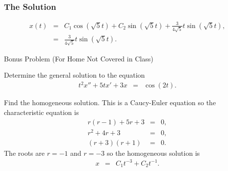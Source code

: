 \begin{frame}
  \frametitle{The Solution}

  \begin{eqnarray*}
    x(t) & = & C_1 \cos(\sqrt{5}t) + C_2\sin(\sqrt{5} t) + \frac{3}{4\sqrt{5}} t \sin(\sqrt{5}t), \\
         & = & \frac{3}{4\sqrt{5}} t \sin(\sqrt{5}t).
  \end{eqnarray*}


\end{frame}


\begin{frame}{Bonus Problem  (For Home Not Covered in Class)}

  Determine the general solution to the equation
  \begin{eqnarray*}
    t^2 x'' + 5t x' + 3x & = & \cos(2t).
  \end{eqnarray*}

  Find the homogeneous solution. This is a Caucy-Euler equation so the
  characteristic equation is
  \begin{eqnarray*}
    r(r-1) + 5r + 3 & = & 0,\\
    r^2 + 4r + 3 & = & 0, \\
    (r+3)(r+1) & = & 0.
  \end{eqnarray*}
  The roots are $r=-1$ and $r=-3$ so the homogeneous solution is
  \begin{eqnarray*}
    x & = & C_1 t^{-3} + C_2 t^{-1}.
  \end{eqnarray*}


\end{frame}

